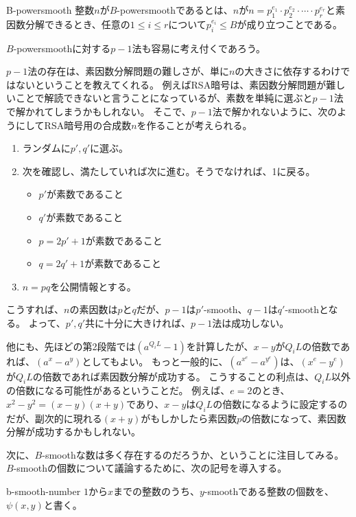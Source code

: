 \begin{Defi}{}{B-powersmooth}
整数$n$が$B$-powersmoothであるとは、$n$が$n=p_1^{e_1}\cdot p_2^{e_2}\cdot\cdots\cdot p_r^{e_r}$と素因数分解できるとき、任意の$1\le i\le r$について$p_i^{e_i}\le B$が成り立つことである。
\end{Defi}

$B$-powersmoothに対する$p-1$法も容易に考え付くであろう。

$p-1$法の存在は、素因数分解問題の難しさが、単に$n$の大きさに依存するわけではないということを教えてくれる。
例えばRSA暗号は、素因数分解問題が難しいことで解読できないと言うことになっているが、素数を単純に選ぶと$p-1$法で解かれてしまうかもしれない。
そこで、$p-1$法で解かれないように、次のようにしてRSA暗号用の合成数$n$を作ることが考えられる。
\begin{enumerate}
\item ランダムに$p', q'$に選ぶ。
\item 次を確認し、満たしていれば次に進む。そうでなければ、1に戻る。
 \begin{itemize}
 \item $p'$が素数であること
 \item $q'$が素数であること
 \item $p = 2p' + 1$が素数であること
 \item $q = 2q' + 1$が素数であること
 \end{itemize}
\item $n=pq$を公開情報とする。
\end{enumerate}

こうすれば、$n$の素因数は$p$と$q$だが、$p-1$は$p'$-smooth、$q-1$は$q'$-smoothとなる。
よって、$p',q'$共に十分に大きければ、$p-1$法は成功しない。

他にも、先ほどの第2段階では$(a^{Q_iL}-1)$を計算したが、$x-y$が$Q_iL$の倍数であれば、$(a^x - a^y)$としてもよい。
もっと一般的に、$(a^{x^e}-a^{y^e})$は、$(x^e-y^e)$が$Q_iL$の倍数であれば素因数分解が成功する。
こうすることの利点は、$Q_iL$以外の倍数になる可能性があるということだ。
例えば、$e=2$のとき、$x^2-y^2=(x-y)(x+y)$であり、$x-y$は$Q_iL$の倍数になるように設定するのだが、副次的に現れる$(x+y)$がもしかしたら素因数$p$の倍数になって、素因数分解が成功するかもしれない。

次に、$B$-smoothな数は多く存在するのだろうか、ということに注目してみる。
$B$-smoothの個数について議論するために、次の記号を導入する。

\begin{Defi}{}{b-smooth-number}
$1$から$x$までの整数のうち、$y$-smoothである整数の個数を、$\psi(x,y)$と書く。
\end{Defi}

